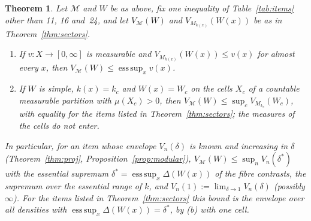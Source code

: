 \documentclass[11pt]{article}
\newcommand{\M}{\mathcal{M}}
\theoremstyle{plain}
\newtheorem{theorem}{Theorem}[section]
\theoremstyle{definition}
\theoremstyle{remark}
\begin{document}
\begin{theorem}\label{thm:integral}
Let $\M$ and $W$ be as above, fix one inequality of Table~\ref{tab:items} other than 11, 16 and~24, and let
$V_\M(W)$ and $V_{M_{k(x)}}(W(x))$ be as in Theorem~\ref{thm:sectors}.
\begin{enumerate}
\item[(a)] If $v:X\to[0,\infty]$ is measurable and $V_{M_{k(x)}}(W(x))\le v(x)$ for almost every $x$, then
$V_\M(W)\le\operatorname{ess\,sup}_xv(x)$.
\item[(b)] If $W$ is simple, $k(x)=k_c$ and $W(x)=W_c$ on the cells $X_c$ of a countable measurable partition with
$\mu(X_c)>0$, then
$V_\M(W)\le\sup_cV_{M_{k_c}}(W_c)$, with equality for the items listed in Theorem~\ref{thm:sectors}; the measures of the
cells do not enter.
\end{enumerate}
In particular, for an item whose envelope $V_n(\delta)$ is known and increasing in $\delta$ (Theorem~\ref{thm:proj},
Proposition~\ref{prop:modular}), $V_\M(W)\le\sup_nV_n(\delta^*)$ with the essential supremum
$\delta^*=\operatorname{ess\,sup}_x\Delta(W(x))$ of the fibre contrasts, the supremum over the essential range of $k$, and
$V_n(1):=\lim_{\delta\to1}V_n(\delta)$ (possibly $\infty$). For the items listed in Theorem~\ref{thm:sectors} this bound
is the envelope over all densities with $\operatorname{ess\,sup}_x\Delta(W(x))=\delta^*$, by (b) with one cell.
\end{theorem}
\end{document}
